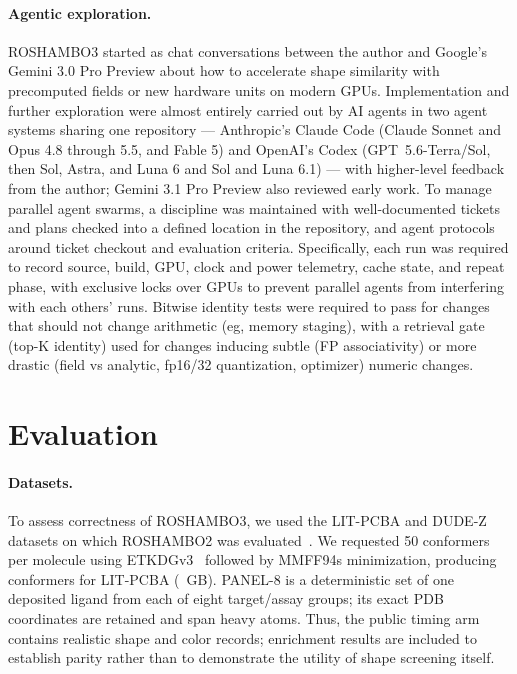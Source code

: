 \documentclass{article}
\begin{document}
\clearpage
\paragraph{Agentic exploration.} ROSHAMBO3 started as chat conversations
between the author and Google's Gemini 3.0 Pro Preview about how to
accelerate shape similarity with precomputed fields or new hardware units on modern GPUs. Implementation
and further exploration were almost entirely carried out by AI agents in two agent systems sharing one repository --- Anthropic's Claude Code (Claude Sonnet and Opus 4.8 through 5.5, and Fable 5) and OpenAI's Codex (GPT~5.6-Terra/Sol, then Sol, Astra, and Luna 6 and Sol and Luna 6.1) --- with higher-level feedback from the author; Gemini 3.1 Pro Preview also reviewed early work. To manage parallel agent swarms, a discipline was maintained with well-documented tickets and plans checked into a defined location in the repository, and agent protocols around ticket checkout and evaluation criteria. Specifically, each run was required to record source, build, GPU, clock and power telemetry, cache state, and repeat phase, with exclusive locks over GPUs to prevent
parallel agents from interfering with each others' runs. Bitwise identity
tests were required to pass for changes that should not change arithmetic
(eg, memory staging), with a retrieval gate (top-K identity) used for changes inducing subtle (FP associativity) or more drastic (field vs analytic, fp16/32 quantization, optimizer) numeric changes.

\section{Evaluation}
\label{sec:evaluation}

\paragraph{Datasets.} 
To assess correctness of ROSHAMBO3, we used the LIT-PCBA and DUDE-Z datasets
on which ROSHAMBO2 was evaluated~\citep{trannguyen2020litpcba,mysinger2012dude}.
We requested 50 conformers per molecule using ETKDGv3~\citep{riniker2015etkdg}
followed by MMFF94s minimization, producing
\LitpcbaCorpusConformers{} conformers for LIT-PCBA (\LitpcbaDiskGigabytes~GB).
PANEL-8 is a deterministic set of one deposited ligand from each of eight target/assay
groups; its exact PDB coordinates are retained and span
\LitpcbaQueryHeavyAtomRange{} heavy atoms. Thus, the public timing arm contains
realistic shape and color records; enrichment results are included to
establish parity rather than to demonstrate the utility of shape screening
itself.
\end{document}
